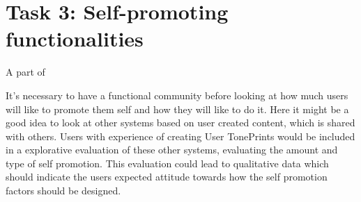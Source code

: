 
\section{Task 3: Self-promoting functionalities}
\label{Task3}
A part of

It's necessary to have a functional community before looking at how much users will like to promote them self and how they will like to do it. Here it might be a good idea to look at other systems based on user created content, which is shared with others. Users with experience of creating User TonePrints would be included in a explorative evaluation of these other systems, evaluating the amount and type of self promotion. This evaluation could lead to qualitative data which should indicate the users expected attitude towards how the self promotion factors should be designed.\\

